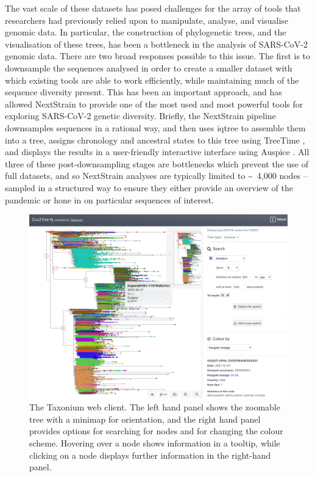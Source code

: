 The vast scale of these datasets has posed challenges for the array of tools that researchers had previously relied upon to manipulate, analyse, and visualise genomic data. In particular, the construction of phylogenetic trees, and the visualisation of these trees, has been a bottleneck in the analysis of SARS-CoV-2 genomic data. There are two broad responses possible to this issue. The first is to downsample the sequences analysed in order to create a smaller dataset with which existing tools are able to work efficiently, while maintaining much of the sequence diversity present. This has been an important approach, and has allowed NextStrain \citep{nextstrain} to provide one of the most used and most powerful tools for exploring SARS-CoV-2 genetic diversity. Briefly, the NextStrain pipeline downsamples sequences in a rational way, and then uses iqtree \citep{iqtree} to assemble them into a tree, assigns chronology and ancestral states to this tree using TreeTime \citep{treetime}, and displays the results in a user-friendly interactive interface using Auspice \citep{nextstrain}. All three of these post-downsampling stages are bottlenecks which prevent the use of full datasets, and so NextStrain analyses are typically limited to \textasciitilde~4,000 nodes -- sampled in a structured way to ensure they either provide an overview of the pandemic or hone in on particular sequences of interest.

\begin{figure}
\begin{center}
\includegraphics[width=\linewidth]{Figures/screenshot2.png}
\end{center}
\caption{The Taxonium web client. The left hand panel shows the zoomable tree with a minimap for orientation, and the right hand panel provides options for searching for nodes and for changing the colour scheme. Hovering over a node shows information in a tooltip, while clicking on a node displays further information in the right-hand panel.}
\label{fig:taxonium_client}
\end{figure}

